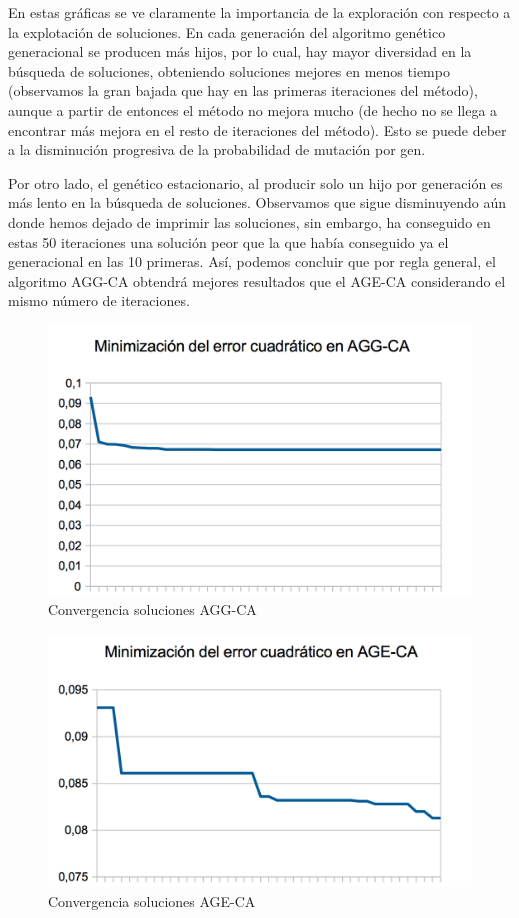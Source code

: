 \documentclass{article}
\begin{document}
	En estas gráficas se ve claramente la importancia de la exploración con respecto a la explotación de soluciones. En cada generación del algoritmo genético generacional se producen más hijos, por lo cual, hay mayor diversidad en la búsqueda de soluciones, obteniendo soluciones mejores en menos tiempo (observamos la gran bajada que hay en las primeras iteraciones del método), aunque a partir de entonces el método no mejora mucho (de hecho no se llega a encontrar más mejora en el resto de iteraciones del método). Esto se puede deber a la disminución progresiva de la probabilidad de mutación por gen.
	
	 Por otro lado, el genético estacionario, al producir solo un hijo por generación es más lento en la búsqueda de soluciones. Observamos que sigue disminuyendo aún donde hemos dejado de imprimir las soluciones, sin embargo, ha conseguido en estas 50 iteraciones una solución peor que la que había conseguido ya el generacional en las 10 primeras. Así, podemos concluir que por regla general, el algoritmo AGG-CA obtendrá mejores resultados que el AGE-CA considerando el mismo número de iteraciones.
	
	\begin{figure}[H]
		\centering
		\includegraphics[width=0.7\linewidth]{aggca}
		\caption{Convergencia soluciones AGG-CA}
		\label{fig:aggca}
	\end{figure}

	\begin{figure}[H]
	\centering
	\includegraphics[width=0.7\linewidth]{ageca}
	\caption{Convergencia soluciones AGE-CA}
	\label{fig:ageca}
\end{figure}
\end{document}
